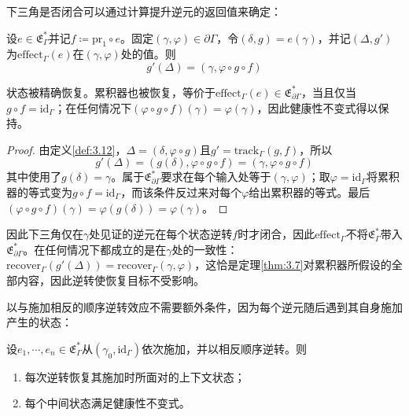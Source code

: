 下三角是否闭合可以通过计算提升逆元的返回值来确定：

\begin{theorem}\label{thm:3.15}
设$e \in \mathfrak{E}^*_\Gamma$并记$f \coloneqq \mathrm{pr}_1 \circ e$。固定$(\gamma, \varphi) \in \partial\Gamma$，令$(\delta, g) = e(\gamma)$，并记$(\Delta, g')$为$\mathrm{effect}_\Gamma(e)$在$(\gamma, \varphi)$处的值。则
\begin{equation}\label{eq:3.16}
g'(\Delta) = (\gamma, \varphi \circ g \circ f)
\end{equation}
\end{theorem}

状态被精确恢复。累积器也被恢复，等价于$\mathrm{effect}_\Gamma(e) \in \mathfrak{E}^*_{\partial\Gamma}$，当且仅当$g \circ f = \mathrm{id}_\Gamma$；在任何情况下$(\varphi \circ g \circ f)(\gamma) = \varphi(\gamma)$，因此健康性不变式得以保持。

\begin{proof}
由定义\ref{def:3.12}，$\Delta = (\delta, \varphi \circ g)$且$g' = \mathrm{track}_\Gamma(g, f)$，所以
\[
g'(\Delta) = (g(\delta), \varphi \circ g \circ f) = (\gamma, \varphi \circ g \circ f)
\]
其中使用了$g(\delta) = \gamma$。属于$\mathfrak{E}^*_{\partial\Gamma}$要求在每个输入处等于$(\gamma, \varphi)$；取$\varphi = \mathrm{id}_\Gamma$将累积器的等式变为$g \circ f = \mathrm{id}_\Gamma$，而该条件反过来对每个$\varphi$给出累积器的等式。最后$(\varphi \circ g \circ f)(\gamma) = \varphi(g(\delta)) = \varphi(\gamma)$。
\end{proof}

因此下三角仅在$\gamma$处见证的逆元在每个状态逆转$f$时才闭合，因此$\mathrm{effect}_\Gamma$不将$\mathfrak{E}^*_\Gamma$带入$\mathfrak{E}^*_{\partial\Gamma}$。在任何情况下都成立的是在$\gamma$处的一致性：$\mathrm{recover}_\Gamma(g'(\Delta)) = \mathrm{recover}_\Gamma(\gamma, \varphi)$，这恰是定理\ref{thm:3.7}对累积器所假设的全部内容，因此逆转使恢复目标不受影响。

以与施加相反的顺序逆转效应不需要额外条件，因为每个逆元随后遇到其自身施加产生的状态：

\begin{theorem}\label{thm:3.16}
设$e_1, \cdots, e_n \in \mathfrak{E}^*_\Gamma$从$(\gamma_0, \mathrm{id}_\Gamma)$依次施加，并以相反顺序逆转。则
\begin{enumerate}
\item 每次逆转恢复其施加时所面对的上下文状态；
\item 每个中间状态满足健康性不变式。
\end{enumerate}
\end{theorem}

